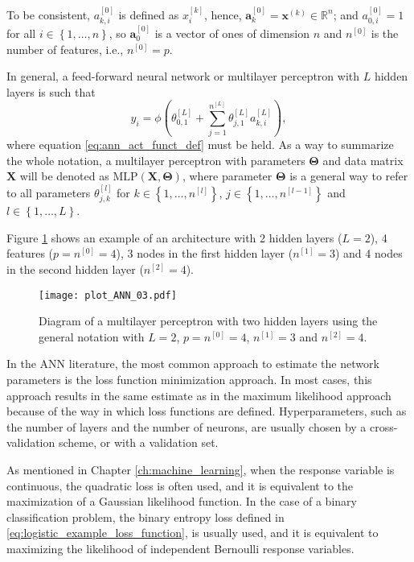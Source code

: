 To be consistent, $a_{k,i}^{[0]}$ is defined as $x_i^{[k]}$, hence, $\boldsymbol{a}_{k}^{[0]} = \boldsymbol{x}^{(k)} \in \mathbb{R}^n$; and $a_{0,i}^{[0]} = 1$ for all $i \in \left\{ 1, \ldots, n \right\}$, so $\boldsymbol{a}_{0}^{[0]}$ is a vector of ones of dimension $n$ and $n^{[0]}$ is the number of features, i.e., $n^{[0]} = p$.

In general, a feed-forward neural network or multilayer perceptron with $L$ hidden layers is such that
\begin{equation}
  y_i = \phi \left( \theta_{0,1}^{[L]} +  \sum_{j = 1}^{n^{[L]}} \theta_{j,1}^{[L]} a_{k,i}^{[L]} \right),
\end{equation}
where equation \eqref{eq:ann_act_funct_def} must be held. As a way to summarize the whole notation, a multilayer perceptron with parameters $\boldsymbol{\Theta}$ and data matrix $\boldsymbol{X}$ will be denoted as $\mathrm{MLP} \left(\boldsymbol{X}, \boldsymbol{\Theta} \right)$, where parameter $\boldsymbol{\Theta}$ is a general way to refer to all parameters $\theta_{j,k}^{[l]}$ for $k \in \left\{ 1, \ldots, n^{[l]} \right\}$, $j \in \left\{ 1, \ldots, n^{[l-1]} \right\}$ and $l \in \left\{ 1, \ldots, L \right\}$.

Figure \ref{fig:theory_ANN_diagram_03} shows an example of an architecture with 2 hidden layers ($L = 2$), 4 features ($p = n^{[0]} = 4$), 3 nodes in the first hidden layer ($n^{[1]} = 3$) and 4 nodes in the second hidden layer ($n^{[2]} = 4$).

\begin{figure}[H]
    \centering
    \texttt{[image: plot\_ANN\_03.pdf]}
    \caption{Diagram of a multilayer perceptron with two hidden layers using the general notation with $L = 2$, $p = n^{[0]} = 4$, $n^{[1]} = 3$ and $n^{[2]} = 4$.}
    \label{fig:theory_ANN_diagram_03}
\end{figure}

In the ANN literature, the most common approach to estimate the network parameters is the loss function minimization approach. In most cases, this approach results in the same estimate as in the maximum likelihood approach because of the way in which loss functions are defined. Hyperparameters, such as the number of layers and the number of neurons, are usually chosen by a cross-validation scheme, or with a validation set.

As mentioned in Chapter \ref{ch:machine_learning}, when the response variable is continuous, the quadratic loss is often used, and it is equivalent to the maximization of a Gaussian likelihood function. In the case of a binary classification problem, the binary entropy loss defined in \eqref{eq:logistic_example_loss_function}, is usually used, and it is equivalent to maximizing the likelihood of independent Bernoulli response variables.

